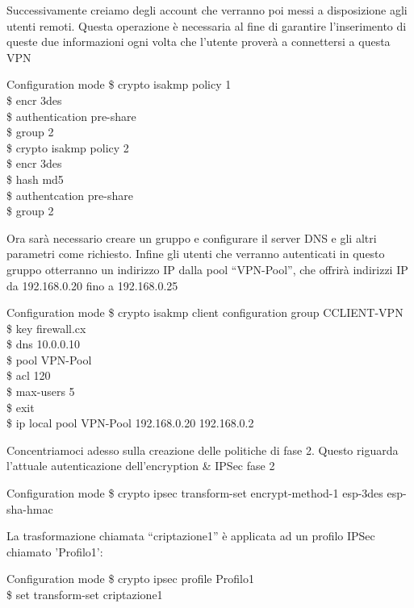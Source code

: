 Successivamente creiamo degli account che verranno poi messi a disposizione agli utenti remoti. Questa operazione è necessaria al fine di garantire l’inserimento di queste due informazioni ogni volta che l’utente proverà a connettersi a questa VPN

\begin{fcmds}{Configuration mode}
    \$ crypto isakmp policy 1\\
    \$ encr 3des\\
    \$ authentication pre-share\\
    \$ group 2\\
    \$ crypto isakmp policy 2\\
    \$ encr 3des\\
    \$ hash md5\\
    \$ authentcation pre-share\\
    \$ group 2
\end{fcmds}

Ora sarà necessario creare un gruppo e configurare il server DNS e gli altri parametri come richiesto. Infine gli utenti che verranno autenticati in questo gruppo otterranno un indirizzo IP dalla pool “VPN-Pool”, che offrirà indirizzi IP da 192.168.0.20 fino a 192.168.0.25

\begin{fcmds}{Configuration mode}
    \$ crypto isakmp client configuration group CCLIENT-VPN\\
    \$ key firewall.cx\\
    \$ dns 10.0.0.10\\
    \$ pool VPN-Pool\\
    \$ acl 120\\
    \$ max-users 5\\
    \$ exit\\
    \$ ip local pool VPN-Pool 192.168.0.20 192.168.0.2
\end{fcmds}

Concentriamoci adesso sulla creazione delle politiche di fase 2. Questo riguarda l’attuale autenticazione dell’encryption \& IPSec fase 2

\begin{fcmds}{Configuration mode}
    \$ crypto ipsec transform-set encrypt-method-1 esp-3des esp-sha-hmac
\end{fcmds}

La trasformazione chiamata “criptazione1” è applicata ad un profilo IPSec chiamato 'Profilo1':

\begin{fcmds}{Configuration mode}
    \$ crypto ipsec profile Profilo1\\
    \$ set transform-set criptazione1
\end{fcmds}

